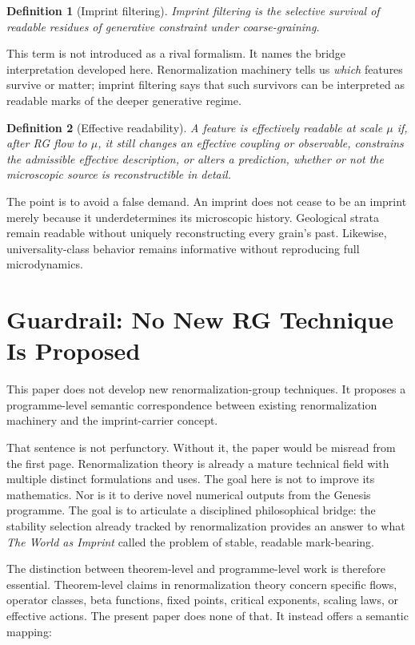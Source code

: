 \documentclass[12pt,a4paper]{article}
\newtheorem{definition}{Definition}[section]
\begin{document}
\begin{definition}[Imprint filtering]
\emph{Imprint filtering} is the selective survival of readable residues of generative constraint under coarse-graining.
\end{definition}

This term is not introduced as a rival formalism. It names the bridge interpretation developed here. Renormalization machinery tells us \emph{which} features survive or matter; imprint filtering says that such survivors can be interpreted as readable marks of the deeper generative regime.

\begin{definition}[Effective readability]
A feature is \emph{effectively readable} at scale $\mu$ if, after RG flow to $\mu$, it still changes an effective coupling or observable, constrains the admissible effective description, or alters a prediction, whether or not the microscopic source is reconstructible in detail.
\end{definition}

The point is to avoid a false demand. An imprint does not cease to be an imprint merely because it underdetermines its microscopic history. Geological strata remain readable without uniquely reconstructing every grain's past. Likewise, universality-class behavior remains informative without reproducing full microdynamics.

\section{Guardrail: No New RG Technique Is Proposed}

This paper does not develop new renormalization-group techniques. It proposes a programme-level semantic correspondence between existing renormalization machinery and the imprint-carrier concept.

That sentence is not perfunctory. Without it, the paper would be misread from the first page. Renormalization theory is already a mature technical field with multiple distinct formulations and uses. The goal here is not to improve its mathematics. Nor is it to derive novel numerical outputs from the Genesis programme. The goal is to articulate a disciplined philosophical bridge: the stability selection already tracked by renormalization provides an answer to what \emph{The World as Imprint} called the problem of stable, readable mark-bearing.

The distinction between theorem-level and programme-level work is therefore essential. Theorem-level claims in renormalization theory concern specific flows, operator classes, beta functions, fixed points, critical exponents, scaling laws, or effective actions. The present paper does none of that. It instead offers a semantic mapping:
\end{document}
